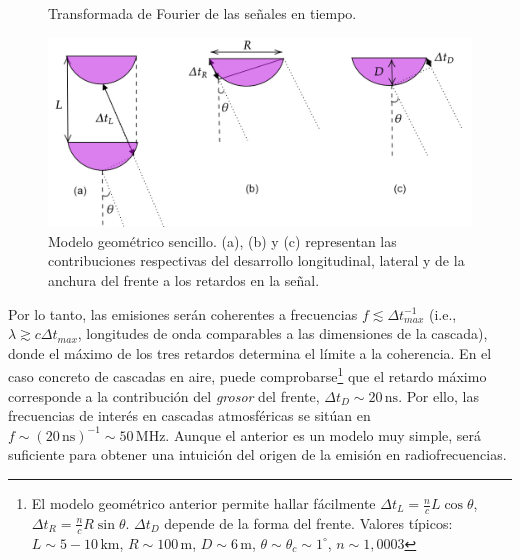 \documentclass[12 pt, a4paper]{article} %
\numberwithin{equation}{section}
\numberwithin{figure}{section}
\numberwithin{table}{section}
\begin{document}
\begin{figure}[H]
	\centering
	\caption{Transformada de Fourier de las señales en tiempo.}
	\label{E_fields_FFT}
\end{figure}
\begin{figure}[H]
	\centering
	\includegraphics[width=.7\linewidth]{figures/radio/coherence_v2}
	\caption{Modelo geométrico sencillo. (a), (b) y (c) representan las contribuciones respectivas del desarrollo longitudinal, lateral y de la anchura del frente a los retardos en la señal.}
	\label{coherence}
\end{figure}

Por lo tanto, las emisiones serán coherentes a frecuencias $f\lesssim\Delta t_{max}^{-1}$ (i.e., $\lambda\gtrsim c\Delta t_{max}$, longitudes de onda comparables a las dimensiones de la cascada), donde el máximo de los tres retardos determina el límite a la coherencia. En el caso concreto de cascadas en aire, puede comprobarse\footnote{El modelo geométrico anterior permite hallar fácilmente $\Delta t_{L}=\frac{n}{c}L\cos{\theta}$, $\Delta t_{R}=\frac{n}{c}R\sin{\theta}$. $\Delta t_D$ depende de la forma del frente. Valores típicos: $L\sim 5-10\,\mathrm{km}$, $R\sim100\,\mathrm{m}$, $D\sim6\,\mathrm{m}$, $\theta\sim\theta_c\sim1^\circ$, $n\sim1,0003$} que el retardo máximo corresponde a la contribución del \textit{grosor} del frente, $\Delta t_D\sim 20\,\mathrm{ns}$. Por ello, las frecuencias de interés en cascadas atmosféricas se sitúan en $f\sim\left(20\,\mathrm{ns}\right)^{-1}\sim50\,\mathrm{MHz}$. Aunque el anterior es un modelo muy simple, será suficiente para obtener una intuición del origen de la emisión en radiofrecuencias.
\end{document}
